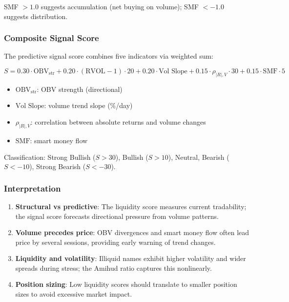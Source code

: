 SMF $> 1.0$ suggests accumulation (net buying on volume); SMF $< -1.0$ suggests distribution.

\subsubsection{Composite Signal Score}

The predictive signal score combines five indicators via weighted sum:

\[
S = 0.30 \cdot \text{OBV}_{\text{str}} + 0.20 \cdot (\text{RVOL} - 1) \cdot 20 + 0.20 \cdot \text{Vol Slope} + 0.15 \cdot \rho_{|R|,V} \cdot 30 + 0.15 \cdot \text{SMF} \cdot 5
\]

\begin{itemize}
  \item[] $\text{OBV}_{\text{str}}$: OBV strength (directional)
  \item[] $\text{Vol Slope}$: volume trend slope (\%/day)
  \item[] $\rho_{|R|,V}$: correlation between absolute returns and volume changes
  \item[] $\text{SMF}$: smart money flow
\end{itemize}

Classification: Strong Bullish ($S > 30$), Bullish ($S > 10$), Neutral, Bearish ($S < -10$), Strong Bearish ($S < -30$).

\subsubsection{Interpretation}

\begin{enumerate}
  \item \textbf{Structural vs predictive}: The liquidity score measures current tradability; the signal score forecasts directional pressure from volume patterns.

  \item \textbf{Volume precedes price}: OBV divergences and smart money flow often lead price by several sessions, providing early warning of trend changes.

  \item \textbf{Liquidity and volatility}: Illiquid names exhibit higher volatility and wider spreads during stress; the Amihud ratio captures this nonlinearly.

  \item \textbf{Position sizing}: Low liquidity scores should translate to smaller position sizes to avoid excessive market impact.
\end{enumerate}
